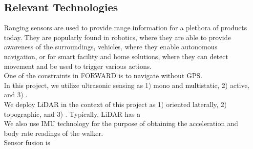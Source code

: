 \subsection{Relevant Technologies}

\noindent Ranging sensors are used to provide range information for a plethora of products today. They are popularly found in robotics, where they are able to provide awareness of the surroundings, vehicles, where they enable autonomous navigation, or for smart facility and home solutions, where they can detect movement and be used to trigger various actions.\\

\noindent One of the constraints in FORWARD is to navigate without GPS.\\

\noindent In this project, we utilize ultrasonic sensing as 1) mono and multistatic, 2) active, and 3) .\\

\noindent We deploy LiDAR in the context of this project as 1) oriented laterally, 2) topographic, and 3) . Typically, LiDAR has a \\

\noindent We also use IMU technology for the purpose of obtaining the acceleration and body rate readings of the walker.\\

\noindent Sensor fusion is  \\


